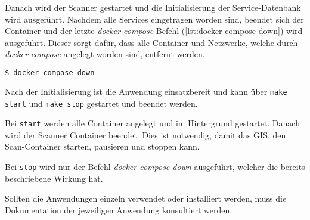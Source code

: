 Danach wird der Scanner gestartet und die Initialisierung der Service-Datenbank wird ausgeführt. Nachdem alle Services eingetragen worden sind, beendet sich der Container und der letzte \textit{docker-compose} Befehl (\ref{lst:docker-compose-down}) wird ausgeführt. Dieser sorgt dafür, dass alle Container und Netzwerke, welche durch \textit{docker-compose} angelegt worden sind, entfernt werden.

\begin{lstlisting}[language=bash, caption={Aufräumen mit docker-compose down (bash)}, captionpos=b, label={lst:docker-compose-down}]
$ docker-compose down
\end{lstlisting}

Nach der Initialisierung ist die Anwendung einsatzbereit und kann über \texttt{make start} und \texttt{make stop} gestartet und beendet werden.

Bei \texttt{start} werden alle Container angelegt und im Hintergrund gestartet. Danach wird der Scanner Container beendet. Dies ist notwendig, damit das GIS, den  Scan-Container starten, pausieren und stoppen kann.

Bei \texttt{stop} wird nur der Befehl \textit{docker-compose down} ausgeführt, welcher die bereits beschriebene Wirkung hat.

Sollten die Anwendungen einzeln verwendet oder installiert werden, muss die Dokumentation der jeweiligen Anwendung konsultiert werden.